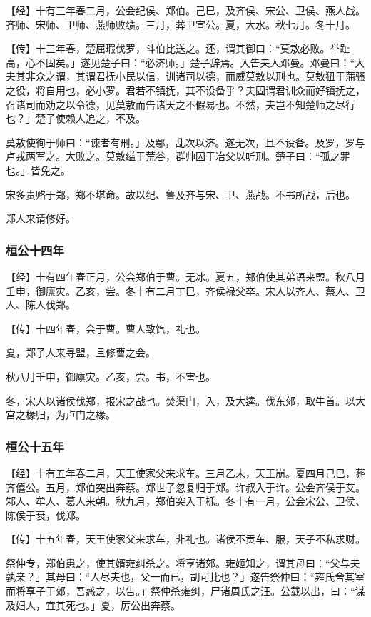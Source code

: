 \documentclass[]{article}
\begin{document}
【经】十有三年春二月，公会纪侯、郑伯。己巳，及齐侯、宋公、卫侯、燕人战。齐师、宋师、卫师、燕师败绩。三月，葬卫宣公。夏，大水。秋七月。冬十月。

【传】十三年春，楚屈瑕伐罗，斗伯比送之。还，谓其御曰：``莫敖必败。举趾高，心不固矣。」遂见楚子曰：``必济师。」楚子辞焉。入告夫人邓曼。邓曼曰：``大夫其非众之谓，其谓君抚小民以信，训诸司以德，而威莫敖以刑也。莫敖狃于蒲骚之役，将自用也，必小罗。君若不镇抚，其不设备乎？夫固谓君训众而好镇抚之，召诸司而劝之以令德，见莫敖而告诸天之不假易也。不然，夫岂不知楚师之尽行也？」楚子使赖人追之，不及。

莫敖使徇于师曰：``谏者有刑。」及鄢，乱次以济。遂无次，且不设备。及罗，罗与卢戎两军之。大败之。莫敖缢于荒谷，群帅囚于冶父以听刑。楚子曰：``孤之罪也。」皆免之。

宋多责赂于郑，郑不堪命。故以纪、鲁及齐与宋、卫、燕战。不书所战，后也。

郑人来请修好。

\hypertarget{header-n298}{%
\subsubsection{桓公十四年 }\label{header-n298}}

【经】十有四年春正月，公会郑伯于曹。无冰。夏五，郑伯使其弟语来盟。秋八月壬申，御廪灾。乙亥，尝。冬十有二月丁巳，齐侯禄父卒。宋人以齐人、蔡人、卫人、陈人伐郑。

【传】十四年春，会于曹。曹人致饩，礼也。

夏，郑子人来寻盟，且修曹之会。

秋八月壬申，御廪灾。乙亥，尝。书，不害也。

冬，宋人以诸侯伐郑，报宋之战也。焚渠门，入，及大逵。伐东郊，取牛首。以大宫之椽归，为卢门之椽。

\hypertarget{header-n306}{%
\subsubsection{桓公十五年}\label{header-n306}}

【经】十有五年春二月，天王使家父来求车。三月乙未，天王崩。夏四月己巳，葬齐僖公。五月，郑伯突出奔蔡。郑世子忽复归于郑。许叔入于许。公会齐侯于艾。邾人、牟人、葛人来朝。秋九月，郑伯突入于栎。冬十有一月，公会宋公、卫侯、陈侯于衰，伐郑。

【传】十五年春，天王使家父来求车，非礼也。诸侯不贡车、服，天子不私求财。

祭仲专，郑伯患之，使其婿雍纠杀之。将享诸郊。雍姬知之，谓其母曰：``父与夫孰亲？」其母曰：``人尽夫也，父一而已，胡可比也？」遂告祭仲曰：``雍氏舍其室而将享子于郊，吾惑之，以告。」祭仲杀雍纠，尸诸周氏之汪。公载以出，曰：``谋及妇人，宜其死也。」夏，厉公出奔蔡。
\end{document}
